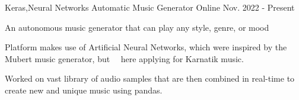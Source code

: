 \documentclass[11pt, a4paper]{russell}
\begin{document}
\begin{cventries}
\cventry
  {\small Keras,Neural Networks} %
  {\normalsize Automatic Music Generator} %
  {\small Online} %
  {\small Nov. 2022 - Present } %
    {
      \begin{cvitems} %
      \item \smallCreating An autonomous music generator that can play any style, genre, or mood
      \item \small Platform makes use of Artificial Neural Networks, which were inspired by the Mubert music generator, but   here applying for Karnatik music.
      \item \small Worked on vast library of audio samples that are then combined in real-time to create new and unique music using pandas. 
      \end{cvitems}
    }


\end{cventries}
\end{document}
